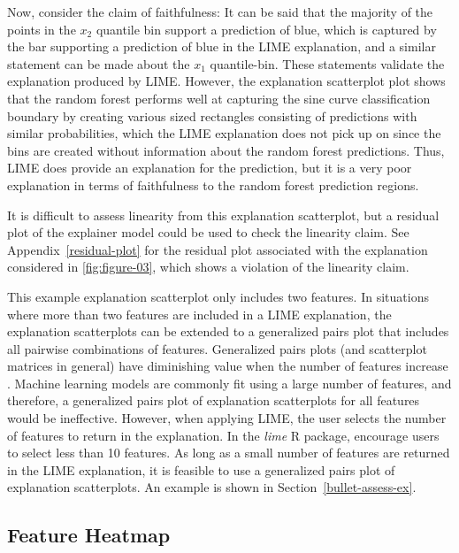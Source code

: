\documentclass[AMS,STIX2COL]{WileyNJD-v2}\usepackage[]{graphicx}\usepackage[]{color}
\begin{document}
Now, consider the claim of faithfulness: It can be said that the majority of the points in the $x_2$ quantile bin support a prediction of blue, which is captured by the bar supporting a prediction of blue in the LIME explanation, and a similar statement can be made about the $x_1$ quantile-bin. These statements validate the explanation produced by LIME. However, the explanation scatterplot plot shows that the random forest performs well at capturing the sine curve classification boundary by creating various sized rectangles consisting of predictions with similar probabilities, which the LIME explanation does not pick up on since the bins are created without information about the random forest predictions. Thus, LIME does provide an explanation for the prediction, but it is a very poor explanation in terms of faithfulness to the random forest prediction regions.

It is difficult to assess linearity from this explanation scatterplot, but a residual plot of the explainer model could be used to check the linearity claim. See Appendix~\ref{residual-plot} for the residual plot associated with the explanation considered in \autoref{fig:figure-03}, which shows a violation of the linearity claim.

This example explanation scatterplot only includes two features. In situations where more than two features are included in a LIME explanation, the explanation scatterplots can be extended to a generalized pairs plot \citep{emerson:2013} that includes all pairwise combinations of features. Generalized pairs plots (and scatterplot matrices in general) have diminishing value when the number of features increase \citep{jensen:2011} \citep{sweller:2011}. Machine learning models are commonly fit using a large number of features, and therefore, a generalized pairs plot of explanation scatterplots for all features would be ineffective. However, when applying LIME, the user selects the number of features to return in the explanation. In the \emph{lime} R package, \citet{pedersen:2020} encourage users to select less than 10 features. As long as a small number of features are returned in the LIME explanation, it is feasible to use a generalized pairs plot of explanation scatterplots. An example is shown in Section~\ref{bullet-assess-ex}.

\subsection{Feature Heatmap} \label{feat-heat}
\end{document}
